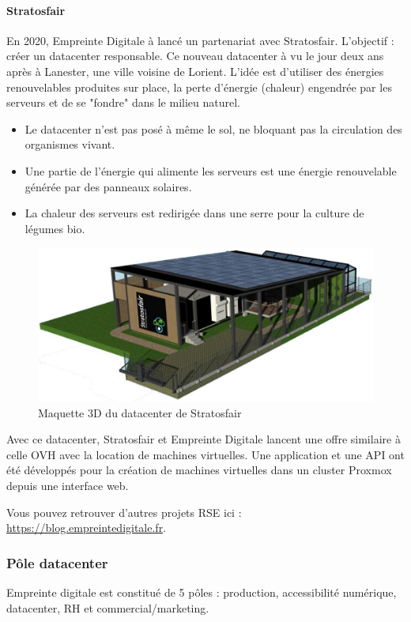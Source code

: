 \documentclass[12pt]{article}
\begin{document}
\paragraph{Stratosfair}
En 2020, Empreinte Digitale à lancé un partenariat avec Stratosfair. 
L'objectif : créer un datacenter responsable. 
Ce nouveau datacenter à vu le jour deux ans après à Lanester, une ville voisine de Lorient. 
L'idée est d'utiliser des énergies renouvelables produites sur place, la perte d'énergie (chaleur) engendrée par les serveurs et de se "fondre" dans le milieu naturel.
\begin{itemize}
    \item Le datacenter n'est pas posé à même le sol, ne bloquant pas la circulation des organismes vivant.
    \item Une partie de l'énergie qui alimente les serveurs est une énergie renouvelable générée par des panneaux solaires.
    \item La chaleur des serveurs est redirigée dans une serre pour la culture de légumes bio.
\end{itemize}

\begin{figure}[!ht]
    \centering
    \includegraphics[width=\textwidth]{src/strato.jpg}
    \caption{Maquette 3D du datacenter de Stratosfair}
    \label{fig:strato}
\end{figure}

Avec ce datacenter, Stratosfair et Empreinte Digitale lancent une offre similaire à celle OVH avec la location de machines virtuelles.
Une application et une API ont été développés pour la création de machines virtuelles dans un cluster Proxmox depuis une interface web.

Vous pouvez retrouver d'autres projets RSE ici : \url{https://blog.empreintedigitale.fr}.

\subsubsection{Pôle datacenter}
Empreinte digitale est constitué de 5 pôles : production, accessibilité numérique, datacenter, RH et commercial/marketing.
\end{document}
